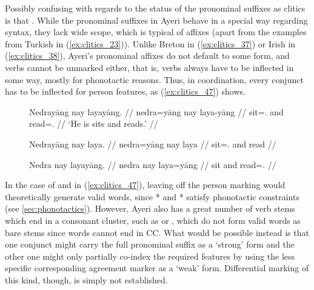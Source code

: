 Possibly confusing with regards to the status of the pronominal suffixes as
cli\-tics is that .
While the pronominal suffixes in Ayeri behave in a special way regarding
syntax, they lack wide scope, which is typical of affixes (apart from the
examples from Turkish in (\ref{ex:clitics_23})). Unlike Breton in
(\ref{ex:clitics_37}) or Irish in (\ref{ex:clitics_38}), Ayeri's pronominal
affixes do not default to some form, and verbs cannot be unmarked either, that
is, verbs always have to be inflected in some way, mostly for phonotactic
reasons. Thus, in coordination, every conjunct has to be inflected for person
features, as (\ref{ex:clitics_47}) shows.

\begin{figure}[h]
\pex\label{ex:clitics_47}
\a\label{ex:clitics_47a}\begingl
	\gla Nedrayāng nay layayāng. //
	\glb nedra=yāng nay laya-yāng //
	\glc sit=\TsgM{}.\Aarg{} and read=\TsgM{}.\Aarg{} //
	\glft `He is sits and reads.' //
\endgl

\a\label{ex:clitics_47b}\ljudge{*}\begingl
	\gla Nedrayāng nay laya. //
	\glb nedra=yāng nay laya //
	\glc sit=\TsgM{}.\Aarg{} and read //
\endgl

\a\label{ex:clitics_47c}\ljudge{*}\begingl
	\gla Nedra nay layayāng. //
	\glb nedra nay laya=yāng //
	\glc sit and read=\TsgM{}.\Aarg{} //
\endgl
\xe
\end{figure}

In the case of  and  in
(\ref{ex:clitics_47}), leaving off the person marking would theoretically
generate valid words, since * and * satisfy
phonotactic constraints (see \autoref{sec:phonotactics}). However, Ayeri also
has a great number of verb stems which end in a consonant cluster, such as
 or , which do not form valid
words as bare stems since words cannot end in CC. What would be possible
instead is that one conjunct might carry the full pronominal suffix as a
`strong' form and the other one might only partially co-index the required
features by using the less specific corresponding agreement marker as a `weak'
form. Differential marking of this kind, though, is simply not established.

